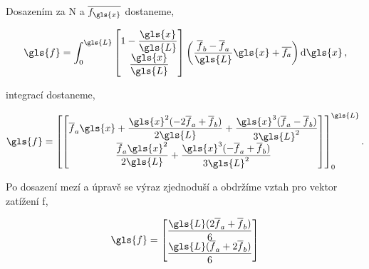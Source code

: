 Dosazením za \gls{N} a $\overline{f_{\gls{x}}}$ dostaneme,

\begin{equation}
    \gls{f} 
    = \int_{0}^{\gls{L}} 
    \begin{bmatrix}
        1 - \dfrac{\gls{x}}{\gls{L}} \\ \dfrac{\gls{x}}{\gls{L}} 
    \end{bmatrix}
    \left( \frac{\overline{f}_b - \overline{f}_a}{\gls{L}} \gls{x} + \overline{f_a} \right)
    \dd{\gls{x}},
\end{equation}

integrací dostaneme,

\begin{equation}
    \gls{f} 
    =
    \left[
    \begin{bmatrix}
        \overline{f}_a \gls{x} 
        + \dfrac{\gls{x}^2 (-2\overline{f}_a + \overline{f}_b)}{2\gls{L}}
        + \dfrac{\gls{x}^3 (\overline{f}_a - \overline{f}_b)}{3\gls{L}^2}
        \\
        \dfrac{\overline{f}_a \gls{x}^2}{2 \gls{L}}
        + \dfrac{\gls{x}^3(-\overline{f}_a+\overline{f}_b)}{3\gls{L}^2}
    \end{bmatrix}
    \right]_{0}^{\gls{L}}.
\end{equation}

Po dosazení mezí a úpravě se výraz zjednoduší a obdržíme vztah pro vektor zatížení \gls{f},

\begin{equation}
    \gls{f}
    =
    \begin{bmatrix}
        \dfrac{\gls{L}(2\overline{f}_a+\overline{f}_b)}{6} \\
        \dfrac{\gls{L}(\overline{f}_a+2\overline{f}_b)}{6}
    \end{bmatrix}
\end{equation}
